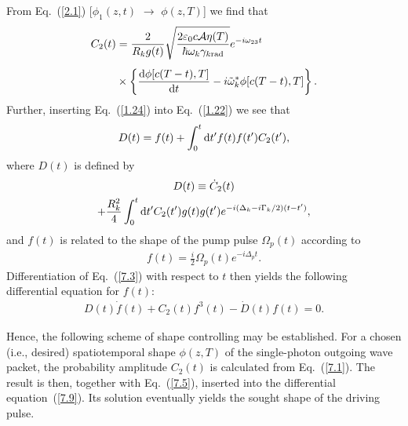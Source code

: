 \documentclass[pra, twocolumn]{revtex4}
\newcommand{\D}{\mbox{\rm d}}
\begin{document}
%
From
Eq.~(\ref{2.1})
[$\phi_1(z,t)$ $\rightarrow$ $\phi(z,T)$] we find that
\begin{align}
  \label{7.1}
  C_2(t) &=
  \frac{2}{R_kg(t)} \sqrt{\frac{2\varepsilon_0c
      \mathcal{A}\eta(T)}{\hbar \omega_k \gamma_{k\mathrm{rad}}}}
  e^{-i \omega_{23} t}
  \nonumber\\[1ex]&
  \times
  \left\lbrace
    \frac{\D \phi[c(T-t),T]}{\D t}
    -i 
    \tilde{\omega}_k^*
    \phi[c(T-t),T]
  \right\rbrace
.
\end{align}
Further, inserting Eq.~(\ref{1.24}) into Eq.~(\ref{1.22}) we see that
\begin{align}
  \label{7.3}
  D(t) = f(t) + \int_0^t \D t' f(t)f(t')C_2(t'),
\end{align}
where $D(t)$ is defined by
\begin{multline}
  \label{7.5}
  D(t) \equiv \dot{C}_2(t)
\\
  + \frac{R_k^2}{4} \int _0^t \D t' C_2(t')
  g(t)g(t')
  e^{-i(\Delta_k - i \Gamma_k/2)(t-t')},
\end{multline}
and $f(t)$ is related to the
%
shape
of the pump pulse $\Omega_p(t)$ according to
\begin{align}
  \label{7.7}
    f(t) = \frac{i}{2} \Omega_p(t) e^{-i\Delta_pt}.
\end{align}
%
Differentiation of Eq.~(\ref{7.3}) with respect to $t$ then yields the
following differential equation for $f(t)$:
\begin{align}
  \label{7.9}
  D(t)\dot{f}(t) + C_2(t) f^3(t)-\dot{D}(t)f(t)=0 .
\end{align}

%
Hence,
%
the following scheme of shape controlling may be established.
For a chosen (i.e., desired) spatiotemporal shape $\phi(z,T)$
of the single-photon outgoing wave packet, the probability
amplitude $C_2(t)$
is
calculated from Eq.~(\ref{7.1}).
The result is then, together with Eq.~(\ref{7.5}), inserted
into the
differential
equation~(\ref{7.9}).
Its solution eventually
yields the sought
%
shape
of the driving pulse.
\end{document}
